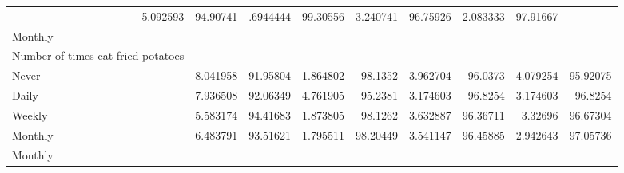 \documentclass{article}
\begin{document}
\begin{tabular}{lllllllll}
  \multicolumn{1}{|r}{5.092593} &
  \multicolumn{1}{r}{94.90741} &
  \multicolumn{1}{r}{.6944444} &
  \multicolumn{1}{r}{99.30556} &
  \multicolumn{1}{r}{3.240741} &
  \multicolumn{1}{r}{96.75926} &
  \multicolumn{1}{r}{2.083333} &
  \multicolumn{1}{r}{97.91667} \\
\multicolumn{1}{l}{\hspace{3em}Monthly} &
  \multicolumn{1}{|r}{} &
  \multicolumn{1}{r}{} &
  \multicolumn{1}{r}{} &
  \multicolumn{1}{r}{} &
  \multicolumn{1}{r}{} &
  \multicolumn{1}{r}{} &
  \multicolumn{1}{r}{} &
  \multicolumn{1}{r}{} \\
\multicolumn{1}{l}{\hspace{4em}Number of times eat fried potatoes} &
  \multicolumn{1}{|r}{} &
  \multicolumn{1}{r}{} &
  \multicolumn{1}{r}{} &
  \multicolumn{1}{r}{} &
  \multicolumn{1}{r}{} &
  \multicolumn{1}{r}{} &
  \multicolumn{1}{r}{} &
  \multicolumn{1}{r}{} \\
\multicolumn{1}{l}{\hspace{5em}Never} &
  \multicolumn{1}{|r}{8.041958} &
  \multicolumn{1}{r}{91.95804} &
  \multicolumn{1}{r}{1.864802} &
  \multicolumn{1}{r}{98.1352} &
  \multicolumn{1}{r}{3.962704} &
  \multicolumn{1}{r}{96.0373} &
  \multicolumn{1}{r}{4.079254} &
  \multicolumn{1}{r}{95.92075} \\
\multicolumn{1}{l}{\hspace{5em}Daily} &
  \multicolumn{1}{|r}{7.936508} &
  \multicolumn{1}{r}{92.06349} &
  \multicolumn{1}{r}{4.761905} &
  \multicolumn{1}{r}{95.2381} &
  \multicolumn{1}{r}{3.174603} &
  \multicolumn{1}{r}{96.8254} &
  \multicolumn{1}{r}{3.174603} &
  \multicolumn{1}{r}{96.8254} \\
\multicolumn{1}{l}{\hspace{5em}Weekly} &
  \multicolumn{1}{|r}{5.583174} &
  \multicolumn{1}{r}{94.41683} &
  \multicolumn{1}{r}{1.873805} &
  \multicolumn{1}{r}{98.1262} &
  \multicolumn{1}{r}{3.632887} &
  \multicolumn{1}{r}{96.36711} &
  \multicolumn{1}{r}{3.32696} &
  \multicolumn{1}{r}{96.67304} \\
\multicolumn{1}{l}{\hspace{5em}Monthly} &
  \multicolumn{1}{|r}{6.483791} &
  \multicolumn{1}{r}{93.51621} &
  \multicolumn{1}{r}{1.795511} &
  \multicolumn{1}{r}{98.20449} &
  \multicolumn{1}{r}{3.541147} &
  \multicolumn{1}{r}{96.45885} &
  \multicolumn{1}{r}{2.942643} &
  \multicolumn{1}{r}{97.05736} \\
\multicolumn{1}{l}{\hspace{1em}Monthly} &

\end{tabular}
\end{document}
